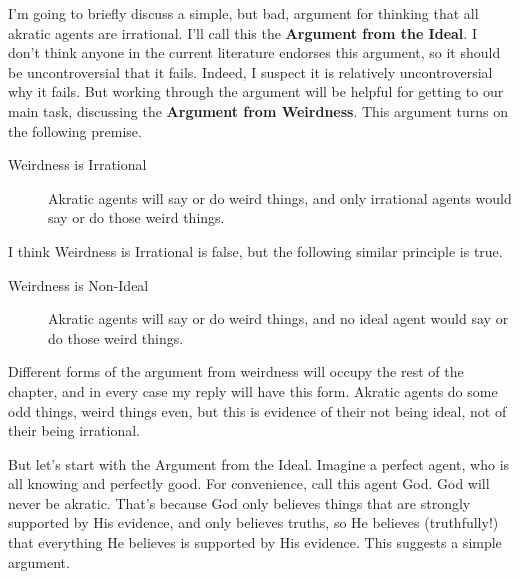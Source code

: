 I'm going to briefly discuss a simple, but bad, argument for thinking that all akratic agents are irrational. I'll call this the \textbf{Argument from the Ideal}. I don't think anyone in the current literature endorses this argument, so it should be uncontroversial that it fails. Indeed, I suspect it is relatively uncontroversial why it fails. But working through the argument will be helpful for getting to our main task, discussing the \textbf{Argument from Weirdness}. This argument turns on the following premise.

\begin{description}
\item[Weirdness is Irrational]

Akratic agents will say or do weird things, and only irrational agents would say or do those weird things.
\end{description}
I think Weirdness is Irrational is false, but the following similar principle is true.

\begin{description}
\item[Weirdness is Non-Ideal]

Akratic agents will say or do weird things, and no ideal agent would say or do those weird things.
\end{description}
Different forms of the argument from weirdness will occupy the rest of the chapter, and in every case my reply will have this form. Akratic agents do some odd things, weird things even, but this is evidence of their not being ideal, not of their being irrational.

But let's start with the Argument from the Ideal. Imagine a perfect agent, who is all knowing and perfectly good. For convenience, call this agent God. God will never be akratic. That's because God only believes things that are strongly supported by His evidence, and only believes truths, so He believes (truthfully!) that everything He believes is supported by His evidence. This suggests a simple argument.

